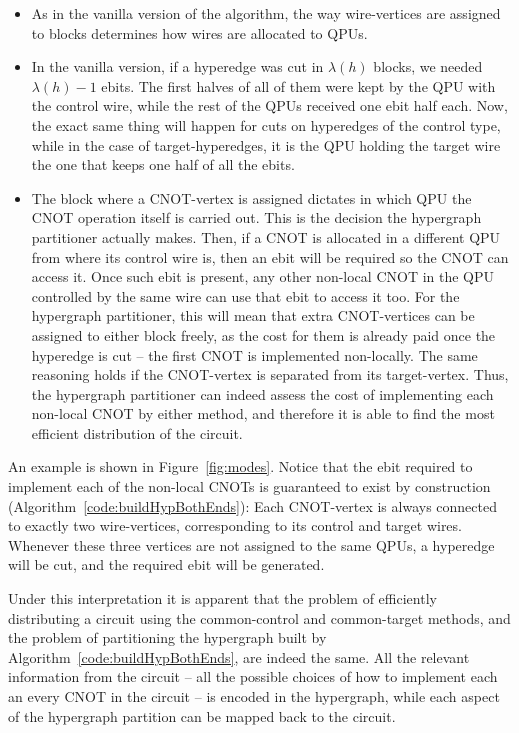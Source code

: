 \begin{itemize}
  \item As in the vanilla version of the algorithm, the way wire-vertices are assigned to blocks determines how wires are allocated to QPUs.
  \item In the vanilla version, if a hyperedge was cut in \(\lambda(h)\) blocks, we needed \(\lambda(h)-1\) ebits. The first halves of all of them were kept by the QPU with the control wire, while the rest of the QPUs received one ebit half each. Now, the exact same thing will happen for cuts on hyperedges of the control type, while in the case of target-hyperedges, it is the QPU holding the target wire the one that keeps one half of all the ebits. 
  \item The block where a CNOT-vertex is assigned dictates in which QPU the CNOT operation itself is carried out. This is the decision the hypergraph partitioner actually makes. Then, if a CNOT is allocated in a different QPU from where its control wire is, then an ebit will be required so the CNOT can access it. Once such ebit is present, any other non-local CNOT in the QPU controlled by the same wire can use that ebit to access it too. For the hypergraph partitioner, this will mean that extra CNOT-vertices can be assigned to either block freely, as the cost for them is already paid once the hyperedge is cut -- the first CNOT is implemented non-locally. The same reasoning holds if the CNOT-vertex is separated from its target-vertex. Thus, the hypergraph partitioner can indeed assess the cost of implementing each non-local CNOT by either method, and therefore it is able to find the most efficient distribution of the circuit.
\end{itemize}

An example is shown in Figure~\ref{fig:modes}. Notice that the ebit required to implement each of the non-local CNOTs is guaranteed to exist by construction (Algorithm~\ref{code:buildHypBothEnds}): Each CNOT-vertex is always connected to exactly two wire-vertices, corresponding to its control and target wires. Whenever these three vertices are not assigned to the same QPUs, a hyperedge will be cut, and the required ebit will be generated.

Under this interpretation it is apparent that the problem of efficiently distributing a circuit using the common-control and common-target methods, and the problem of partitioning the hypergraph built by Algorithm~\ref{code:buildHypBothEnds}, are indeed the same. All the relevant information from the circuit -- all the possible choices of how to implement each an every CNOT in the circuit -- is encoded in the hypergraph, while each aspect of the hypergraph partition can be mapped back to the circuit.

